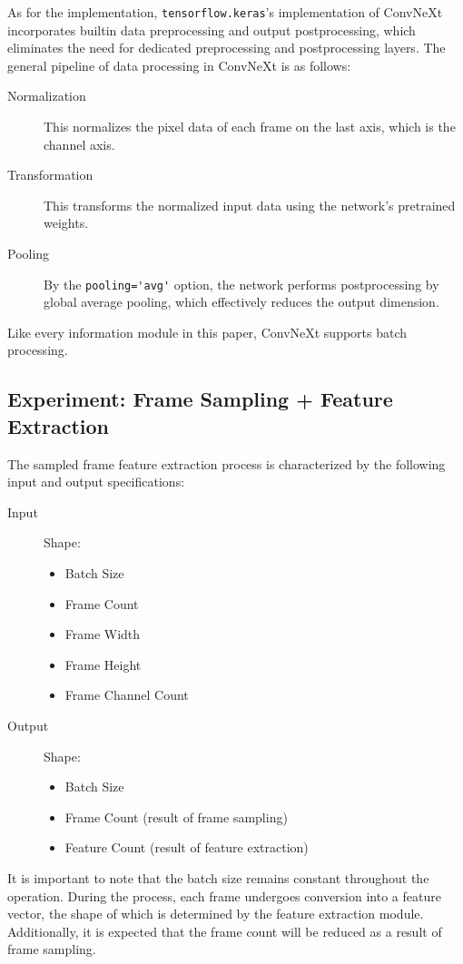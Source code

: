 \documentclass[letterpaper]{article} %
\begin{document}
As for the implementation,
\lstinline|tensorflow.keras|'s implementation of ConvNeXt 
incorporates builtin data preprocessing and output postprocessing,
which eliminates the need for dedicated preprocessing and postprocessing layers.
The general pipeline of data processing in ConvNeXt is as follows:
\begin{description}
  \item[Normalization]
  This normalizes the pixel data of each frame on the last axis, 
  which is the channel axis.
  \item[Transformation]
  This transforms the normalized input data using the network's pretrained weights.
  \item[Pooling]
  By the \lstinline|pooling='avg'| option, the network performs postprocessing by
  global average pooling, which effectively reduces the output dimension.
\end{description}

Like every information module in this paper,
ConvNeXt supports batch processing.

\subsection{Experiment: Frame Sampling + Feature Extraction}
The sampled frame feature extraction process is 
characterized by the following input and output specifications:
\begin{description}
  \item[Input]
  Shape: \begin{itemize}
    \item Batch Size
    \item Frame Count
    \item Frame Width
    \item Frame Height
    \item Frame Channel Count
  \end{itemize}
  \item[Output] 
  Shape: \begin{itemize}
    \item Batch Size
    \item Frame Count (result of frame sampling)
    \item Feature Count (result of feature extraction)
  \end{itemize}
\end{description}
It is important to note that the batch size remains 
constant throughout the operation. During the process, 
each frame undergoes conversion into a feature vector, 
the shape of which is determined by the feature extraction module. 
Additionally, it is expected that the frame count 
will be reduced as a result of frame sampling.
\end{document}
